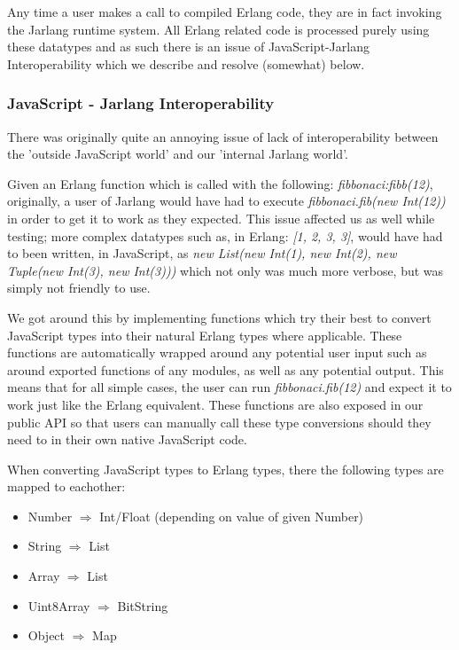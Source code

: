 \documentclass[twoside,12pt,titlepage,a4paper]{article}
\begin{document}
Any time a user makes a call to compiled Erlang code, they are in fact invoking the Jarlang runtime system. All Erlang related code is processed purely using these datatypes and as such there is an issue of JavaScript-Jarlang Interoperability which we describe and resolve (somewhat) below.

\subsubsection{JavaScript - Jarlang Interoperability}
There was originally quite an annoying issue of lack of interoperability between the 'outside JavaScript world' and our 'internal Jarlang world'. 

Given an Erlang function which is called with the following: \textit{fibbonaci:fibb(12)}, originally, a user of Jarlang would have had to execute \textit{fibbonaci.fib(new Int(12))} in order to get it to work as they expected. This issue affected us as well while testing; more complex datatypes such as, in Erlang: \textit{[1, 2, {3, 3}]}, would have had to been written, in JavaScript, as \textit{new List(new Int(1), new Int(2), new Tuple(new Int(3), new Int(3)))} which not only was much more verbose, but was simply not friendly to use.

We got around this by implementing functions which try their best to convert JavaScript types into their natural Erlang types where applicable. These functions are automatically wrapped around any potential user input such as around exported functions of any modules, as well as any potential output. This means that for all simple cases, the user can run \textit{fibbonaci.fib(12)} and expect it to work just like the Erlang equivalent. These functions are also exposed in our public API so that users can manually call these type conversions should they need to in their own native JavaScript code.

When converting JavaScript types to Erlang types, there the following types are mapped to eachother:

\begin{itemize}
\item Number $\Rightarrow$ Int/Float (depending on value of given Number)
\item String $\Rightarrow$ List
\item Array $\Rightarrow$ List
\item Uint8Array $\Rightarrow$ BitString
\item Object $\Rightarrow$ Map
\end{itemize}
\end{document}
